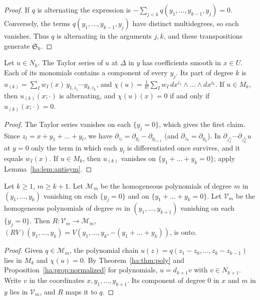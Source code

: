 \begin{proof}
If \(q\) is alternating the expression is \(-\sum_{j<k}q(y_1,\dots,
y_{k-1},y_j)=0\). Conversely, the terms \(q(y_1,\dots,y_{k-1},y_j)\) have
distinct multidegrees, so each vanishes. Thus \(q\) is alternating in the
arguments \(j,k\), and these transpositions generate \(\mathfrak S_k\).
\end{proof}

\begin{lemma}\label{ha:lem:leading}
Let \(u\in N_k\). The Taylor series of \(u\) at \(\Delta\) in \(y\) has
coefficients smooth in \(x\in U\). Each of its monomials contains a
component of every \(y_j\). Its part of degree \(k\) is
\(u_{(k)}=\sum_Iw_I(x)\,y_{1,i_1}\cdots y_{k,i_k}\), and
\(\chi(u)=\frac1{k!}\sum_Iw_I\,dx^{i_1}\wedge\dots\wedge dx^{i_k}\). If
\(u\in M_k\), then \(u_{(k)}(x;\cdot)\) is alternating, and \(\chi(u)(x)=0\)
if and only if \(u_{(k)}(x;\cdot)=0\).
\end{lemma}

\begin{proof}
The Taylor series vanishes on each \(\{y_j=0\}\), which gives the first
claim. Since \(z_l=x+y_1+\dots+y_l\), we have \(\partial_{z_l}=
\partial_{y_l}-\partial_{y_{l+1}}\) (and \(\partial_{z_k}=\partial_{y_k}\)).
In \(\partial_{z_1^{i_1}}\cdots\partial_{z_k^{i_k}}u\) at \(y=0\) only the
term in which each \(y_l\) is differentiated once survives, and it equals
\(w_I(x)\). If \(u\in M_k\), then \(u_{(k)}\) vanishes on
\(\{y_1+\dots+y_k=0\}\); apply Lemma~\ref{ha:lem:antisym}.
\end{proof}

\begin{lemma}\label{ha:lem:polylift}
Let \(k\ge1\), \(m\ge k+1\). Let \(\mathcal M_m\) be the homogeneous
polynomials of degree \(m\) in \((y_1,\dots,y_k)\) vanishing on each
\(\{y_j=0\}\) and on \(\{y_1+\dots+y_k=0\}\). Let \(\mathcal V_m\) be the
homogeneous polynomials of degree \(m\) in \((y_1,\dots,y_{k+1})\)
vanishing on each \(\{y_j=0\}\). Then \(R:\mathcal V_m\to\mathcal M_m\),
\((RV)(y_1,\dots,y_k)=V(y_1,\dots,y_k,-(y_1+\dots+y_k))\), is onto.
\end{lemma}

\begin{proof}
Given \(q\in\mathcal M_m\), the polynomial chain \(u(z)=q(z_1-z_0,\dots,
z_k-z_{k-1})\) lies in \(M_k\) and \(\chi(u)=0\). By
Theorem~\ref{ha:thm:poly} and Proposition~\ref{ha:prop:normalized} for
polynomials, \(u=d_{k+1}v\) with \(v\in N_{k+1}\). Write \(v\) in the
coordinates \(x,y_1,\dots,y_{k+1}\). Its component of degree \(0\) in
\(x\) and \(m\) in \(y\) lies in \(\mathcal V_m\), and \(R\) maps it to
\(q\).
\end{proof}

